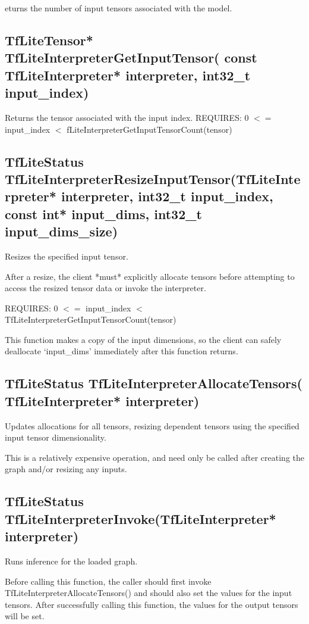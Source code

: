 \documentclass{ol-softwaremanual}
\begin{document}
eturns the number of input tensors associated with the model.

\subsection{TfLiteTensor* TfLiteInterpreterGetInputTensor(
    const TfLiteInterpreter* interpreter, int32\_t input\_index)}

Returns the tensor associated with the input index.
REQUIRES: 0 $<=$ input\_index $<$ fLiteInterpreterGetInputTensorCount(tensor)

\subsection{TfLiteStatus TfLiteInterpreterResizeInputTensor(TfLiteInterpreter* interpreter, int32\_t input\_index, const int* input\_dims,
    int32\_t input\_dims\_size)}

Resizes the specified input tensor.

After a resize, the client *must* explicitly allocate tensors before attempting to access the resized tensor data or invoke the interpreter.

REQUIRES: 0 $<=$ input\_index $<$ TfLiteInterpreterGetInputTensorCount(tensor)

This function makes a copy of the input dimensions, so the client can safely deallocate `input\_dims' immediately after this function returns.

\subsection{TfLiteStatus TfLiteInterpreterAllocateTensors(  TfLiteInterpreter* interpreter)}

Updates allocations for all tensors, resizing dependent tensors using the specified input tensor dimensionality.

This is a relatively expensive operation, and need only be called after creating the graph and/or resizing any inputs.

\subsection{TfLiteStatus TfLiteInterpreterInvoke(TfLiteInterpreter* interpreter)}

Runs inference for the loaded graph.

Before calling this function, the caller should first invoke TfLiteInterpreterAllocateTensors() and should also set the values for the input tensors.  After successfully calling this function, the values for the output tensors will be set.
\end{document}
